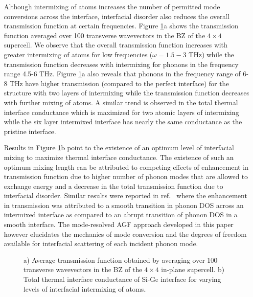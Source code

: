 \documentclass[11pt]{article}
\begin{document}
Although intermixing of atoms increases the number of permitted mode conversions across the interface, interfacial disorder also reduces the overall transmission function at certain frequencies. Figure \ref{tot_cond}a shows the transmission function averaged over 100 transverse wavevectors in the BZ of the $4\times 4$ supercell. We observe that the overall transmission function increases with greater intermixing of atoms for low frequencies ($\omega = 1.5-3$ THz) while the transmission function decreases with intermixing for phonons in the frequency range 4.5-6 THz. Figure \ref{tot_cond}a also reveals that phonons in the frequency range of 6-8 THz have higher transmission (compared to the perfect interface) for the structure with two layers of intermixing while the transmission function decreases with further mixing of atoms. A similar trend is observed in the total thermal interface conductance which is maximized for two atomic layers of intermixing while the six layer intermixed interface has nearly the same conductance as the pristine interface. 

Results in Figure \ref{tot_cond}b point to the existence of an optimum level of interfacial mixing to maximize thermal interface conductance. The existence of such an optimum mixing length can be attributed to competing effects of enhancement in transmission function due to higher number of phonon modes that are allowed to exchange energy and a decrease in the total transmission function due to interfacial disorder. Similar results were reported in ref.~\cite{tian2012enhancing} where the enhancement in transmission was attributed to a smooth transition in phonon DOS across an intermixed interface as compared to an abrupt transition of phonon DOS in a smooth interface. The mode-resolved AGF approach developed in this paper however elucidates the mechanics of mode conversion and the degrees of freedom available for interfacial scattering of each incident phonon mode.
\begin{figure}
\centering
{}
\caption{a) Average transmission function obtained by averaging over 100 transverse wavevectors in the BZ of the $4\times 4$ in-plane supercell. b) Total thermal interface conductance of Si-Ge interface for varying levels of interfacial intermixing of atoms.}\label{tot_cond}
\end{figure}
\end{document}
